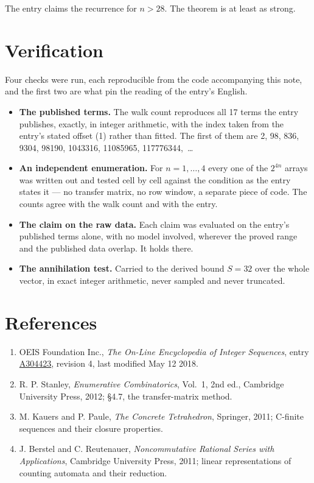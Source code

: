 \documentclass[11pt]{article}
\theoremstyle{definition}
\begin{document}
The entry claims the recurrence for $n > 28$. The theorem is at least as strong.

\section{Verification}

Four checks were run, each reproducible from the code accompanying this note, and the first two are what pin the reading of the entry's English.

\begin{itemize}

\item {\bfseries The published terms.} The walk count reproduces all 17 terms the entry publishes, exactly, in integer arithmetic, with the index taken from the entry's stated offset (1) rather than fitted. The first of them are 2, 98, 836, 9304, 98190, 1043316, 11085965, 117776344,~\dots

\item {\bfseries An independent enumeration.} For $n = 1,\dots,4$ every one of the $2^{4n}$ arrays was written out and tested cell by cell against the condition as the entry states it --- no transfer matrix, no row window, a separate piece of code. The counts agree with the walk count and with the entry.

\item {\bfseries The claim on the raw data.} Each claim was evaluated on the entry's published terms alone, with no model involved, wherever the proved range and the published data overlap. It holds there.

\item {\bfseries The annihilation test.} Carried to the derived bound $S = 32$ over the whole vector, in exact integer arithmetic, never sampled and never truncated.

\end{itemize}

\section{References}

\begin{enumerate}

\item OEIS Foundation Inc., \emph{The On-Line Encyclopedia of Integer Sequences}, entry \href{https://oeis.org/A304423}{A304423}, revision 4, last modified May 12 2018.

\item R. P. Stanley, \emph{Enumerative Combinatorics}, Vol.~1, 2nd ed., Cambridge University Press, 2012; \S4.7, the transfer-matrix method.

\item M. Kauers and P. Paule, \emph{The Concrete Tetrahedron}, Springer, 2011; C-finite sequences and their closure properties.

\item J. Berstel and C. Reutenauer, \emph{Noncommutative Rational Series with Applications}, Cambridge University Press, 2011; linear representations of counting automata and their reduction.

\end{enumerate}
\end{document}
